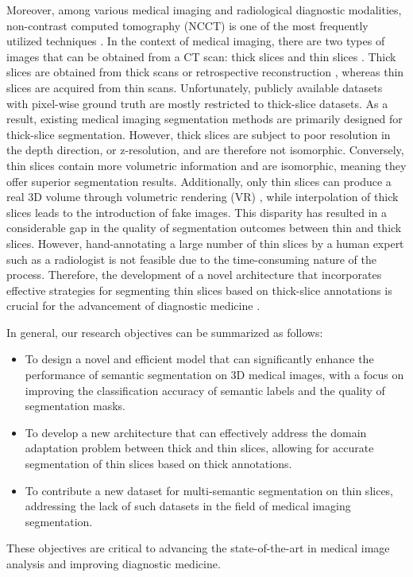 \documentclass{article}
\begin{document}
Moreover, among various medical imaging and radiological diagnostic modalities, non-contrast computed tomography (NCCT) is one of the most frequently utilized techniques \cite{24}. In the context of medical imaging, there are two types of images that can be obtained from a CT scan: thick slices and thin slices \cite{25}. Thick slices are obtained from thick scans or retrospective reconstruction \cite{26}, whereas thin slices are acquired from thin scans. Unfortunately, publicly available datasets with pixel-wise ground truth are mostly restricted to thick-slice datasets. As a result, existing medical imaging segmentation methods are primarily designed for thick-slice segmentation. However, thick slices are subject to poor resolution in the depth direction, or z-resolution, and are therefore not isomorphic. Conversely, thin slices contain more volumetric information and are isomorphic, meaning they offer superior segmentation results. Additionally, only thin slices can produce a real 3D volume through volumetric rendering (VR) \cite{27}, while interpolation of thick slices leads to the introduction of fake images. This disparity has resulted in a considerable gap in the quality of segmentation outcomes between thin and thick slices. However, hand-annotating a large number of thin slices by a human expert such as a radiologist is not feasible due to the time-consuming nature of the process. Therefore, the development of a novel architecture that incorporates effective strategies for segmenting thin slices based on thick-slice annotations is crucial for the advancement of diagnostic medicine \cite{zhang2023thinthick}.

In general, our research objectives can be summarized as follows: 
\begin{itemize}
    \item To design a novel and efficient model that can significantly enhance the performance of semantic segmentation on 3D medical images, with a focus on improving the classification accuracy of semantic labels and the quality of segmentation masks.
    \item To develop a new architecture that can effectively address the domain adaptation problem between thick and thin slices, allowing for accurate segmentation of thin slices based on thick annotations.
    \item To contribute a new dataset for multi-semantic segmentation on thin slices, addressing the lack of such datasets in the field of medical imaging segmentation.
\end{itemize}
These objectives are critical to advancing the state-of-the-art in medical image analysis and improving diagnostic medicine.
\end{document}
